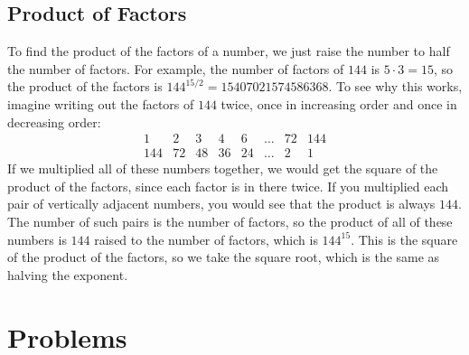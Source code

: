 \documentclass{article}
\begin{document}
\begin{multicols}{2}
	\subsection*{Product of Factors}
	To find the product of the factors of a number, we just raise the number to half the
	number of factors.
	For example, the number of factors of $144$ is $5 \cdot 3 = 15$, so the product of the factors
	is $144^{15 / 2} = 15407021574586368$.
	To see why this works, imagine writing out the factors of $144$ twice,
	once in increasing order and once in decreasing order:
	\[
		\begin{array}{cccccccc}
			1   & 2  & 3  & 4  & 6  & \dots & 72 & 144 \\
			144 & 72 & 48 & 36 & 24 & \dots & 2  & 1
		\end{array}
	\]
	If we multiplied all of these numbers together, we would get the square of the
	product of the factors, since each factor is in there twice.
	If you multiplied each pair of vertically adjacent numbers, you would see that the product
	is always $144$.
	The number of such pairs is the number of factors, so the product of all of these numbers
	is $144$ raised to the number of factors, which is $144^{15}$.
	This is the square of the product of the factors, so we take the square root,
	which is the same as halving the exponent.
\end{multicols}

\section*{Problems}
\end{document}
